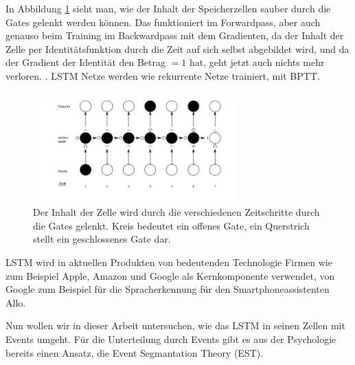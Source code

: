 In Abbildung \ref{img:lstm2} sieht man, wie der Inhalt der Speicherzellen sauber durch die Gates gelenkt werden können. Das funktioniert im Forwardpass, aber auch genauso beim Training im Backwardpass mit dem Gradienten, da der Inhalt der Zelle per Identitätsfunktion durch die Zeit auf sich selbst abgebildet wird, und da der Gradient der Identität den Betrag \( = 1 \) hat, geht jetzt auch nichts mehr verloren. \cite{bib:lstm}. LSTM Netze werden wie rekurrente Netze trainiert, mit BPTT.
\begin{figure}
	\centering
	\includegraphics[width=0.7\textwidth, height=160px]{pics/lstm2.png}	
	\caption{Der Inhalt der Zelle wird durch die verschiedenen Zeitschritte durch die Gates gelenkt. Kreis bedeutet ein offenes Gate, ein Querstrich stellt ein geschlossenes Gate dar.    \cite{bib:graves}}
	\label{img:lstm2}
\end{figure}

LSTM wird in aktuellen Produkten von bedeutenden Technologie Firmen wie zum Beispiel Apple\cite{bib:apple}, Amazon\cite{bib:amazon} und Google als Kernkomponente verwendet, von Google zum Beispiel für die Spracherkennung für den Smartphoneassistenten Allo\cite{bib:allo}. 

Nun wollen wir in dieser Arbeit untersuchen, wie das LSTM in seinen Zellen mit Events umgeht. Für die Unterteilung durch Events gibt es aus der Psychologie bereits einen Ansatz, die Event Segmantation Theory (EST).

